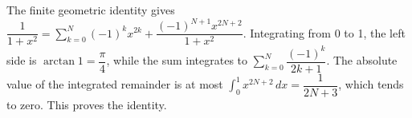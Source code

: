 The finite geometric identity gives $\dfrac{1}{1+x^2}=\sum_{k=0}^{N}(-1)^kx^{2k}+\dfrac{(-1)^{N+1}x^{2N+2}}{1+x^2}$. Integrating from 0 to 1, the left side is $\arctan1=\dfrac{\pi}{4}$, while the sum integrates to $\sum_{k=0}^{N}\dfrac{(-1)^k}{2k+1}$. The absolute value of the integrated remainder is at most $\int_0^1x^{2N+2}\,dx=\dfrac{1}{2N+3}$, which tends to zero. This proves the identity.
